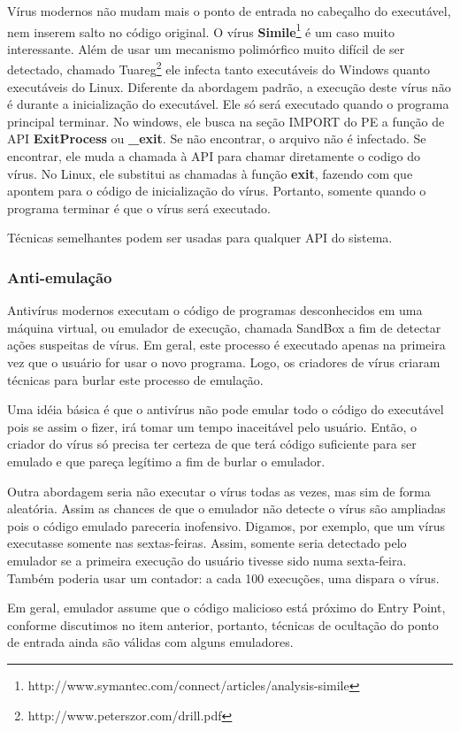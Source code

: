 Vírus modernos não mudam mais o ponto de entrada no cabeçalho do executável, nem inserem salto no código original. O vírus \textbf{Simile}\footnote{http://www.symantec.com/connect/articles/analysis-simile} é um caso muito interessante. Além de usar um mecanismo polimórfico muito difícil de ser detectado, chamado Tuareg\footnote{http://www.peterszor.com/drill.pdf} ele infecta tanto executáveis do Windows quanto executáveis do Linux. Diferente da abordagem padrão, a execução deste vírus não é durante a inicialização do executável. Ele só será executado quando o programa principal terminar. No windows, ele busca na seção IMPORT do PE a função de API \textbf{ExitProcess} ou \textbf{\_exit}. Se não encontrar, o arquivo não é infectado. Se encontrar, ele muda a chamada à API para chamar diretamente o codigo do vírus. No Linux, ele substitui as chamadas à função \textbf{exit}, fazendo com que apontem para o código de inicialização do vírus. Portanto, somente quando o programa terminar é que o vírus será executado.

Técnicas semelhantes podem ser usadas para qualquer API do sistema.

\subsubsection{Anti-emulação}
Antivírus modernos executam o código de programas desconhecidos em uma máquina virtual, ou emulador de execução, chamada SandBox a fim de detectar ações suspeitas de vírus. Em geral, este processo é executado apenas na primeira vez que o usuário for usar o novo programa. Logo, os criadores de vírus criaram técnicas para burlar este processo de emulação.

Uma idéia básica é que o antivírus não pode emular todo o código do executável pois se assim o fizer, irá tomar um tempo inaceitável pelo usuário. Então, o criador do vírus só precisa ter certeza de que terá código suficiente para ser emulado e que pareça legítimo a fim de burlar o emulador.

Outra abordagem seria não executar o vírus todas as vezes, mas sim de forma aleatória. Assim as chances de que o emulador não detecte o vírus são ampliadas pois o código emulado pareceria inofensivo. Digamos, por exemplo, que um vírus executasse somente nas sextas-feiras. Assim, somente seria detectado pelo emulador se a  primeira execução do usuário tivesse sido numa sexta-feira. Também poderia usar um contador: a cada 100 execuções, uma dispara o vírus.

Em geral, emulador assume que o código malicioso está próximo do Entry Point, conforme discutimos no item anterior, portanto, técnicas de ocultação do ponto de entrada ainda são válidas com alguns emuladores.

